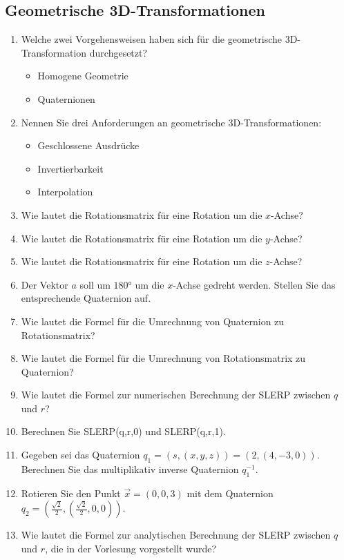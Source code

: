 \subsection{Geometrische 3D-Transformationen}
\begin{enumerate}
\item Welche zwei Vorgehensweisen haben sich für die geometrische 3D-Transformation durchgesetzt? \\
\begin{itemize}
	\item Homogene Geometrie
	\item Quaternionen
\end{itemize}
\item Nennen Sie drei Anforderungen an geometrische 3D-Transformationen:
\begin{itemize}
	\item Geschlossene Ausdrücke
	\item Invertierbarkeit
	\item Interpolation
\end{itemize}
\item Wie lautet die Rotationsmatrix für eine Rotation um die $x$-Achse? %
\item Wie lautet die Rotationsmatrix für eine Rotation um die $y$-Achse? %
\item Wie lautet die Rotationsmatrix für eine Rotation um die $z$-Achse?
\item Der Vektor $a$ soll um $180°$ um die $x$-Achse gedreht werden. Stellen Sie das entsprechende Quaternion auf. 
\item Wie lautet die Formel für die Umrechnung von Quaternion zu Rotationsmatrix?
\item Wie lautet die Formel für die Umrechnung von Rotationsmatrix zu Quaternion?
\item Wie lautet die Formel zur numerischen Berechnung der SLERP zwischen $q$ und $r$?
\item Berechnen Sie SLERP(q,r,0) und SLERP(q,r,1).
	\item Gegeben sei das Quaternion $q_1=(s,(x,y,z))=(2,(4,-3,0))$. Berechnen Sie das multiplikativ inverse Quaternion $q^{-1}_{1}$. %
	\item Rotieren Sie den Punkt $\vec{x}=(0,0,3)$ mit dem Quaternion $q_2=(\frac{\sqrt{2}}{2},(\frac{\sqrt{2}}{2},0,0))$. %
	\item Wie lautet die Formel zur analytischen Berechnung der SLERP zwischen $q$ und $r$, die in der Vorlesung vorgestellt wurde? %
\end{enumerate}


